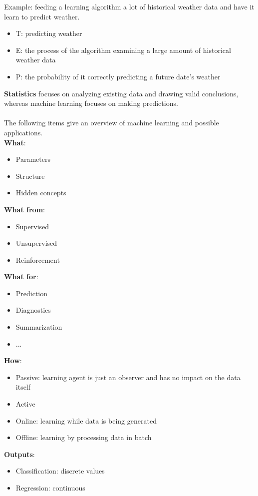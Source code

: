 \documentclass{report}
\begin{document}
Example: feeding a learning algorithm a lot of historical weather data and have it learn to predict weather.
\begin{itemize}
\item T: predicting weather
\item E: the process of the algorithm examining a large amount of historical weather data
\item P: the probability of it correctly predicting a future date's weather
\end{itemize}


{\bf Statistics} focuses on analyzing existing data and drawing valid conclusions, whereas machine learning focuses on making predictions.
\\
\\
The following items give an overview of machine learning and possible applications.
\\
{\bf What}:
\begin{itemize}
  \item Parameters
  \item Structure
  \item Hidden concepts
\end{itemize}

{\bf What from}:
\begin{itemize}
  \item Supervised
  \item Unsupervised
  \item Reinforcement
\end{itemize}

{\bf What for}:
\begin{itemize}
  \item Prediction
  \item Diagnostics
  \item Summarization
  \item ...
\end{itemize}

{\bf How}:
\begin{itemize}
  \item Passive: learning agent is just an observer and has no impact on the data itself
  \item Active
  \item Online: learning while data is being generated
  \item Offline: learning by processing data in batch
\end{itemize}

{\bf Outputs}:
\begin{itemize}
  \item Classification: discrete values
  \item Regression: continuous
\end{itemize}
\end{document}

